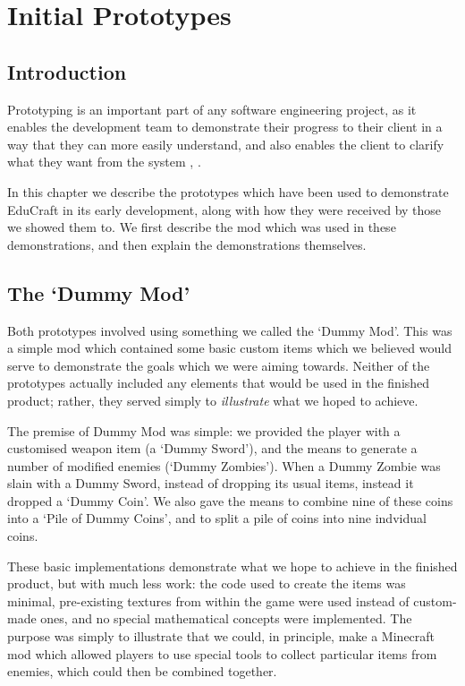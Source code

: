 \chapter{Initial Prototypes}

\section{Introduction}
Prototyping is an important part of any software engineering project,
as it enables the development team to demonstrate their progress to
their client in a way that they can more easily understand, and also
enables the client to clarify what they want from the system
\cite{brooks87}, \cite{sommerville11}.

In this chapter we describe the prototypes which have been used to
demonstrate EduCraft in its early development, along with how they were
received by those we showed them to. We first describe the mod which
was used in these demonstrations, and then explain the demonstrations
themselves.

\section{The `Dummy Mod'}
Both prototypes involved using something we called the `Dummy Mod'.
This was a simple mod which contained some basic custom items
which we believed would serve to demonstrate the goals which we were
aiming towards. Neither of the prototypes actually included any
elements that would be used in the finished product; rather, they served
simply to \textit{illustrate} what we hoped to achieve.

The premise of Dummy Mod was simple: we provided the player with a
customised weapon item (a `Dummy Sword'), and the means to generate a
number of modified enemies (`Dummy Zombies'). When a Dummy Zombie was
slain with a Dummy Sword, instead of dropping its usual items, instead it 
dropped a `Dummy Coin'. We also gave the means to combine nine of these coins 
into a `Pile of Dummy Coins', and to split a pile of coins into nine indvidual 
coins.

These basic implementations demonstrate what we hope to achieve in the
finished product, but with much less work: the code used to create the
items was minimal, pre-existing textures from within the game were
used instead of custom-made ones, and no special mathematical concepts
were implemented. The purpose was simply to illustrate that we could,
in principle, make a Minecraft mod which allowed players to use special
tools to collect particular items from enemies, which could then be
combined together.

